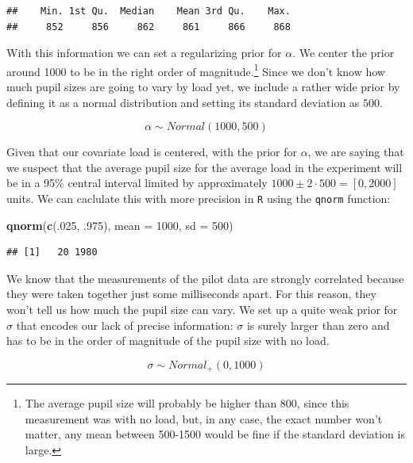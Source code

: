 \documentclass[12pt,]{krantz}
\newenvironment{Shaded}{\begin{snugshade}}{\end{snugshade}}
\newcommand{\KeywordTok}[1]{\textcolor[rgb]{0.13,0.29,0.53}{\textbf{#1}}}
\newcommand{\DataTypeTok}[1]{\textcolor[rgb]{0.13,0.29,0.53}{#1}}
\newcommand{\DecValTok}[1]{\textcolor[rgb]{0.00,0.00,0.81}{#1}}
\newcommand{\FloatTok}[1]{\textcolor[rgb]{0.00,0.00,0.81}{#1}}
\newcommand{\NormalTok}[1]{#1}
\theoremstyle{definition}
\theoremstyle{definition}
\theoremstyle{definition}
\theoremstyle{remark}
\begin{document}
\begin{verbatim}
##    Min. 1st Qu.  Median    Mean 3rd Qu.    Max. 
##     852     856     862     861     866     868
\end{verbatim}

With this information we can set a regularizing prior for \(\alpha\). We
center the prior around 1000 to be in the right order of
magnitude.\footnote{The average pupil size will probably be higher than
  800, since this measurement was with no load, but, in any case, the
  exact number won't matter, any mean between 500-1500 would be fine if
  the standard deviation is large.} Since we don't know how much pupil
sizes are going to vary by load yet, we include a rather wide prior by
defining it as a normal distribution and setting its standard deviation
as \(500\).

\begin{equation}
\alpha \sim Normal(1000, 500) 
\end{equation}

Given that our covariate load is centered, with the prior for
\(\alpha\), we are saying that we suspect that the average pupil size
for the average load in the experiment will be in a 95\% central
interval limited by approximately \(1000 \pm 2 \cdot 500 = [0, 2000]\)
units. We can caclulate this with more precision in \texttt{R} using the
\texttt{qnorm} function:

\begin{Shaded}
\begin{Highlighting}[]
\KeywordTok{qnorm}\NormalTok{(}\KeywordTok{c}\NormalTok{(.}\DecValTok{025}\NormalTok{, }\FloatTok{.975}\NormalTok{), }\DataTypeTok{mean =} \DecValTok{1000}\NormalTok{, }\DataTypeTok{sd =} \DecValTok{500}\NormalTok{)}
\end{Highlighting}
\end{Shaded}

\begin{verbatim}
## [1]   20 1980
\end{verbatim}

We know that the measurements of the pilot data are strongly correlated
because they were taken together just some milliseconds apart. For this
reason, they won't tell us how much the pupil size can vary. We set up a
quite weak prior for \(\sigma\) that encodes our lack of precise
information: \(\sigma\) is surely larger than zero and has to be in the
order of magnitude of the pupil size with no load.

\begin{equation}
\sigma \sim Normal_+(0, 1000)
\end{equation}
\end{document}
